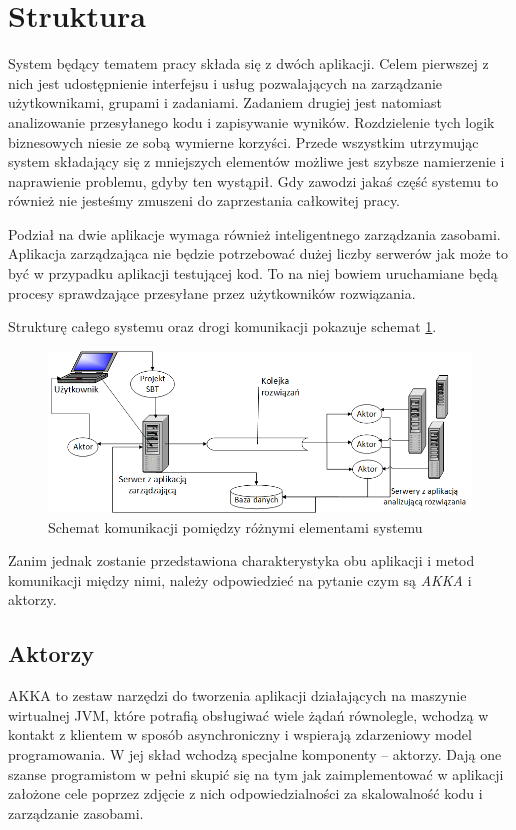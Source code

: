 \documentclass[brudnopis]{xmgr}
\begin{document}
\section{Struktura}
\label{section:struktrura}
System będący tematem pracy składa się z dwóch aplikacji. Celem pierwszej z nich jest udostępnienie interfejsu i usług pozwalających na zarządzanie użytkownikami, grupami i zadaniami.
Zadaniem drugiej jest natomiast analizowanie przesyłanego kodu i zapisywanie wyników. Rozdzielenie tych logik biznesowych niesie ze sobą wymierne korzyści. Przede wszystkim utrzymując system składający się z mniejszych elementów możliwe jest szybsze namierzenie i naprawienie problemu, gdyby ten wystąpił. Gdy zawodzi jakaś część systemu to również nie jesteśmy zmuszeni do zaprzestania całkowitej pracy. 

Podział na dwie aplikacje wymaga również inteligentnego zarządzania zasobami. Aplikacja zarządzająca nie będzie potrzebować dużej liczby serwerów jak może to być w przypadku aplikacji testującej kod. To na niej bowiem uruchamiane będą procesy sprawdzające przesyłane przez użytkowników rozwiązania.

Strukturę całego systemu oraz drogi komunikacji pokazuje schemat \ref{system:schemat}. 

\begin{figure}[!tbh]
\centering 
\includegraphics[width=1.05\hsize]{fig/scaxerciser_schemat}
\caption{Schemat komunikacji pomiędzy różnymi elementami systemu\label{system:schemat}}
\end{figure}

Zanim jednak zostanie przedstawiona charakterystyka obu aplikacji i metod komunikacji między nimi, należy odpowiedzieć na pytanie czym są \emph{AKKA} i aktorzy.

\subsection{Aktorzy}

AKKA to zestaw narzędzi do tworzenia aplikacji działających na maszynie wirtualnej JVM, które potrafią obsługiwać wiele żądań równolegle, wchodzą w kontakt z klientem w sposób asynchroniczny i wspierają zdarzeniowy model programowania. W jej skład wchodzą specjalne komponenty -- aktorzy. Dają one szanse programistom w pełni skupić się na tym jak zaimplementować w aplikacji założone cele poprzez zdjęcie z nich odpowiedzialności za skalowalność kodu i zarządzanie zasobami.   
\end{document}
